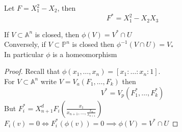 \documentclass[../main.tex]{subfiles}
\begin{document}
\begin{exemple}
Let $F= X_1^{2}-X_2$, then
\[ 
F^{*}= X_1^{2}-X_2X_3
\]

\end{exemple}
\begin{lemma}
If $V \subset \mathbb{A}^{n}$ is closed, then $\phi( V) = V^{*}\cap U $  \\
Conversely, if $V \subset \mathbb{P}^{n}$ is closed then $ \phi^{-1}( V\cap U) = V_*$ \\
In particular $\phi$ is a homeomorphism		
\end{lemma}
\begin{proof}
Recall that $\phi( x_1,\ldots,x_n) = [ x_1:\ldots:x_n:1] $.\\
For $V \subset \mathbb{A}^{n}$ write $V = V_a( F_1,\ldots,F_k) $ then
\[ 
V^{*}= V_p( F_1^{*},\ldots,F_k^{*}) 
\]
But $ F_i^{*}= X_{n+1}^{d}F_i(  \frac{x_1}{x_{n+1} ,\ldots, \frac{x_n}{x_{n+1} }}) $ $ F_i( v) =0 \iff F_i^{*}( \phi( v) ) =0 \implies \phi( V) = V^{*}\cap U$ 
\end{proof}






	


		
\end{document}
